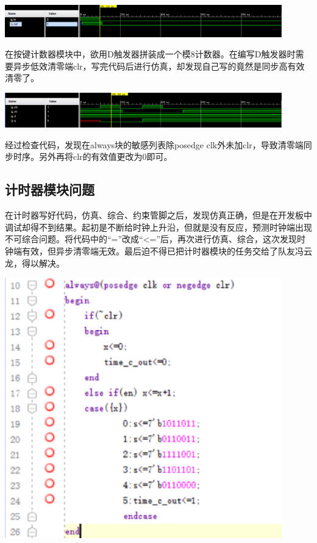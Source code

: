 \documentclass[a4paper,11pt]{ctexart}
\begin{document}
\includegraphics[width=0.9\textwidth]{./images/Lsim2.eps}

在按键计数器模块中，欲用D触发器拼装成一个模8计数器。在编写D触发器时需要异步低效清零端clr，写完代码后进行仿真，却发现自己写的竟然是同步高有效清零了。

\includegraphics[width=0.9\textwidth]{./images/Lsim3.eps}

经过检查代码，发现在always块的敏感列表除posedge clk外未加clr，导致清零端同步时序。另外再将clr的有效值更改为0即可。

\subsection{计时器模块问题}
在计时器写好代码，仿真、综合、约束管脚之后，发现仿真正确，但是在开发板中调试却得不到结果。起初是不断给时钟上升沿，但就是没有反应，预测时钟端出现不可综合问题。将代码中的“=”改成“<=”后，再次进行仿真、综合，这次发现时钟端有效，但异步清零端无效。最后迫不得已把计时器模块的任务交给了队友冯云龙，得以解决。

\includegraphics[width=0.9\textwidth]{./images/pic3.eps}
\end{document}
